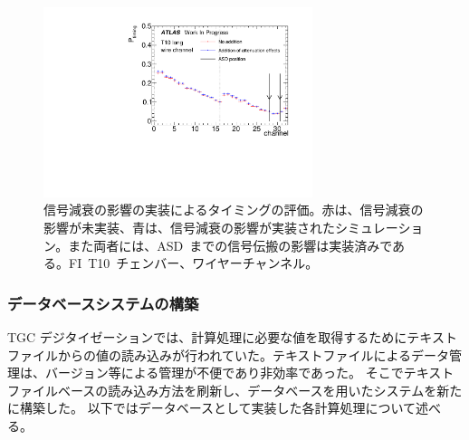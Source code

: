 \begin{figure}[tbp]
    \centering   
    \includegraphics[width=0.7\textwidth,page=1]{img/plot/att.pdf}
    \caption[信号減衰の影響の実装によるタイミングの評価]{信号減衰の影響の実装によるタイミングの評価。赤は、信号減衰の影響が未実装、青は、信号減衰の影響が実装されたシミュレーション。また両者には、ASD~までの信号伝搬の影響は実装済みである。FI~T10~チェンバー、ワイヤーチャンネル。}
    \label{fig:att}
\end{figure}

\subsubsection{データベースシステムの構築}
TGC デジタイゼーションでは、計算処理に必要な値を取得するためにテキストファイルからの値の読み込みが行われていた。テキストファイルによるデータ管理は、バージョン等による管理が不便であり非効率であった。
そこでテキストファイルベースの読み込み方法を刷新し、データベースを用いたシステムを新たに構築した。
以下ではデータベースとして実装した各計算処理について述べる。

